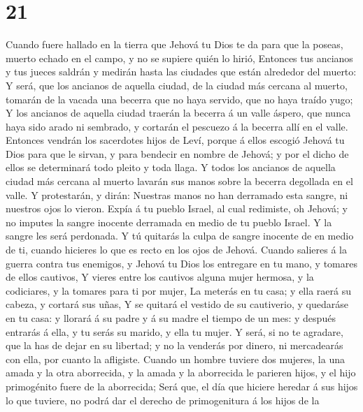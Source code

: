\hypertarget{section-20}{%
\section{21}\label{section-20}}

 Cuando fuere hallado en la tierra que Jehová tu Dios te da
para que la poseas, muerto echado en el campo, y no se supiere quién lo
hirió,  Entonces tus ancianos y tus jueces saldrán y medirán
hasta las ciudades que están alrededor del muerto:  Y será,
que los ancianos de aquella ciudad, de la ciudad más cercana al muerto,
tomarán de la vacada una becerra que no haya servido, que no haya traído
yugo;  Y los ancianos de aquella ciudad traerán la becerra á
un valle áspero, que nunca haya sido arado ni sembrado, y cortarán el
pescuezo á la becerra allí en el valle.  Entonces vendrán
los sacerdotes hijos de Leví, porque á ellos escogió Jehová tu Dios para
que le sirvan, y para bendecir en nombre de Jehová; y por el dicho de
ellos se determinará todo pleito y toda llaga.  Y todos los
ancianos de aquella ciudad más cercana al muerto lavarán sus manos sobre
la becerra degollada en el valle.  Y protestarán, y dirán:
Nuestras manos no han derramado esta sangre, ni nuestros ojos lo vieron.
 Expía á tu pueblo Israel, al cual redimiste, oh Jehová; y
no imputes la sangre inocente derramada en medio de tu pueblo Israel. Y
la sangre les será perdonada.  Y tú quitarás la culpa de
sangre inocente de en medio de ti, cuando hicieres lo que es recto en
los ojos de Jehová.  Cuando salieres á la guerra contra tus
enemigos, y Jehová tu Dios los entregare en tu mano, y tomares de ellos
cautivos,  Y vieres entre los cautivos alguna mujer
hermosa, y la codiciares, y la tomares para ti por mujer, 
La meterás en tu casa; y ella raerá su cabeza, y cortará sus uñas,
 Y se quitará el vestido de su cautiverio, y quedaráse en
tu casa: y llorará á su padre y á su madre el tiempo de un mes: y
después entrarás á ella, y tu serás su marido, y ella tu mujer.
 Y será, si no te agradare, que la has de dejar en su
libertad; y no la venderás por dinero, ni mercadearás con ella, por
cuanto la afligiste.  Cuando un hombre tuviere dos mujeres,
la una amada y la otra aborrecida, y la amada y la aborrecida le
parieren hijos, y el hijo primogénito fuere de la aborrecida;
 Será que, el día que hiciere heredar á sus hijos lo que
tuviere, no podrá dar el derecho de primogenitura á los hijos de la
